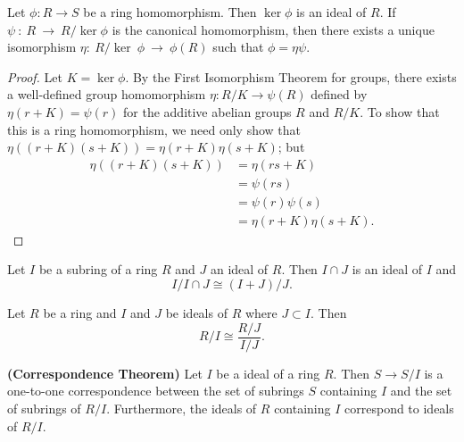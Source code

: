  
\begin{theorem}
Let $\phi : R \rightarrow S$ be a ring homomorphism. Then $\ker \phi$
is an ideal of $R$. If $\psi~:~R~\rightarrow~R/\ker \phi$ is the
canonical homomorphism, then there exists a unique isomorphism
$\eta:~R/\ker~\phi~\rightarrow~\phi(R)$ such that $\phi = \eta \psi$. 
\end{theorem}
 
 
\begin{proof}
Let $K = \ker \phi$. By the First Isomorphism Theorem for groups, there
exists a well-defined group homomorphism $\eta: R/K \rightarrow
\psi(R)$ defined by $\eta(r + K) = \psi(r)$ for the additive abelian
groups $R$ and $R/K$.  To show that this is a ring homomorphism, we
need only show that $\eta( (r + K)(s + K) ) = \eta(r + K) \eta( s +
K)$; but
\begin{align*}
\eta( (r + K)( s +K )) & = \eta(r s +K ) \\
& = \psi(r s) \\
& = \psi(r) \psi(s) \\
& = \eta( r + K ) \eta( s + K ).
\end{align*}
\end{proof}
 
 
\begin{theorem}
Let $I$ be a  subring of a ring $R$  and  $J$ an ideal of $R$.  Then
$I \cap J$ is an ideal of $I$ and 
\[
I / I \cap J \cong (I+ J) /J.
\]
\end{theorem}
 
 
\begin{theorem}
Let $R$ be a ring and $I$ and $J$ be ideals of $R$ where $J \subset
I$.  Then 
\[
R/I \cong \frac{R/J}{I/J}.
\]
\end{theorem}
 
 
\begin{theorem} {\bf (Correspondence Theorem)}
Let $I$ be a ideal of a ring $R$. Then $S \rightarrow S/I$ is a
one-to-one correspondence between the set of subrings $S$ containing
$I$  and the set of subrings of $R/I$. Furthermore, the ideals
of $R$ containing $I$ correspond to ideals of $R/I$. 
\end{theorem}
 
 
 
 
 
